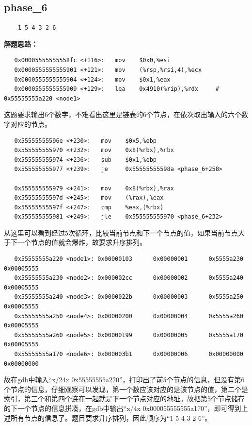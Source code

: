 \documentclass{article}
\begin{document}
\subsection{phase\_6}
\begin{verbatim}
    1 5 4 3 2 6
\end{verbatim}
\textbf{解题思路：}
\begin{verbatim}
   0x00005555555558fc <+116>:   mov    $0x0,%esi
   0x0000555555555901 <+121>:   mov    (%rsp,%rsi,4),%ecx
   0x0000555555555904 <+124>:   mov    $0x1,%eax
   0x0000555555555909 <+129>:   lea    0x4910(%rip),%rdx     # 0x55555555a220 <node1>
\end{verbatim}
这题要求输出6个数字，不难看出这里是链表的6个节点，在依次取出输入的六个数字对应的节点。
\begin{verbatim}
   0x55555555596e <+230>:   mov    $0x5,%ebp
   0x555555555970 <+232>:   mov    0x8(%rbx),%rbx
   0x555555555974 <+236>:   sub    $0x1,%ebp
   0x555555555977 <+239>:   je     0x55555555598a <phase_6+258>

   0x555555555979 <+241>:   mov    0x8(%rbx),%rax
   0x55555555597d <+245>:   mov    (%rax),%eax
   0x55555555597f <+247>:   cmp    %eax,(%rbx)
   0x555555555981 <+249>:   jle    0x555555555970 <phase_6+232>
\end{verbatim}
从这里可以看到经过5次循环，比较当前节点和下一个节点的值，如果当前节点大于下一个节点的值就会爆炸，故要求升序排列。
\begin{verbatim}
   0x55555555a220 <node1>: 0x00000103      0x00000001      0x5555a230      0x00005555
   0x55555555a230 <node2>: 0x000002cc      0x00000002      0x5555a240      0x00005555
   0x55555555a240 <node3>: 0x0000022b      0x00000003      0x5555a250      0x00005555
   0x55555555a250 <node4>: 0x00000200      0x00000004      0x5555a260      0x00005555
   0x55555555a260 <node5>: 0x00000199      0x00000005      0x5555a170      0x00005555
   0x55555555a170 <node6>: 0x000003b1      0x00000006      0x00000000      0x00000000
\end{verbatim}
故在gdb中输入“x/24x 0x55555555a220”，打印出了前5个节点的信息，但没有第6个节点的信息，仔细观察可以发现，第一个数应该对应的是该节点的值，第二个是索引，第三个和第四个连在一起就是下一个节点对应的地址。故把第5个节点储存的下一个节点的信息拼凑，在gdb中输出“x/4x 0x000055555555a170”，即可得到上述所有节点的信息了。题目要求升序排列，因此顺序为“1 5 4 3 2 6”。
\end{document}
